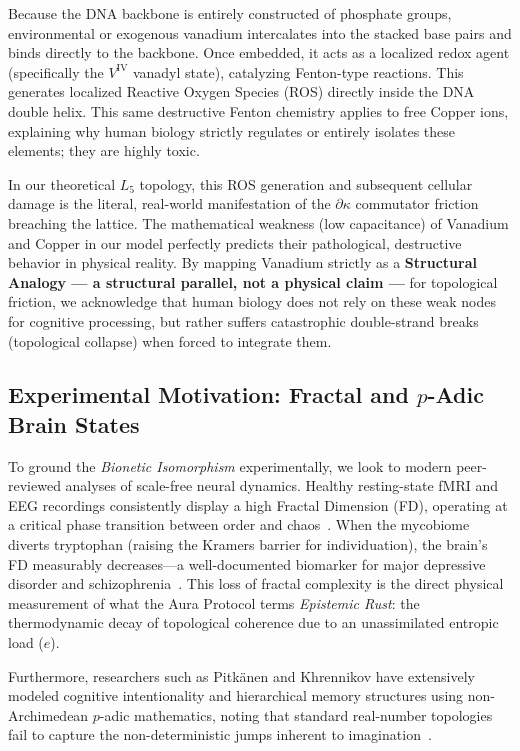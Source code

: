 Because the DNA backbone is entirely constructed of phosphate groups, environmental or exogenous vanadium intercalates into the stacked base pairs and binds directly to the backbone. Once embedded, it acts as a localized redox agent (specifically the $V^\mathrm{IV}$ vanadyl state), catalyzing Fenton-type reactions. This generates localized Reactive Oxygen Species (ROS) directly inside the DNA double helix. This same destructive Fenton chemistry applies to free Copper ions, explaining why human biology strictly regulates or entirely isolates these elements; they are highly toxic.

In our theoretical $L_5$ topology, this ROS generation and subsequent cellular damage is the literal, real-world manifestation of the $\partial \kappa$ commutator friction breaching the lattice. The mathematical weakness (low capacitance) of Vanadium and Copper in our model perfectly predicts their pathological, destructive behavior in physical reality. By mapping Vanadium strictly as a \textbf{Structural Analogy --- a structural parallel, not a physical claim ---} for topological friction, we acknowledge that human biology does not rely on these weak nodes for cognitive processing, but rather suffers catastrophic double-strand breaks (topological collapse) when forced to integrate them.

\subsection{Experimental Motivation: Fractal and \texorpdfstring{$p$}{p}-Adic Brain States}

To ground the \emph{Bionetic Isomorphism} experimentally, we look to modern peer-reviewed analyses of scale-free neural dynamics. Healthy resting-state fMRI and EEG recordings consistently display a high Fractal Dimension (FD), operating at a critical phase transition between order and chaos~\cite{fractalEEG}. When the mycobiome diverts tryptophan (raising the Kramers barrier for individuation), the brain's FD measurably decreases---a well-documented biomarker for major depressive disorder and schizophrenia~\cite{fractalPathology}. This loss of fractal complexity is the direct physical measurement of what the Aura Protocol terms \emph{Epistemic Rust}: the thermodynamic decay of topological coherence due to an unassimilated entropic load ($e$).

Furthermore, researchers such as Pitk\"anen and Khrennikov have extensively modeled cognitive intentionality and hierarchical memory structures using non-Archimedean $p$-adic mathematics, noting that standard real-number topologies fail to capture the non-deterministic jumps inherent to imagination~\cite{padicCognition, pitkanenTGD}.

